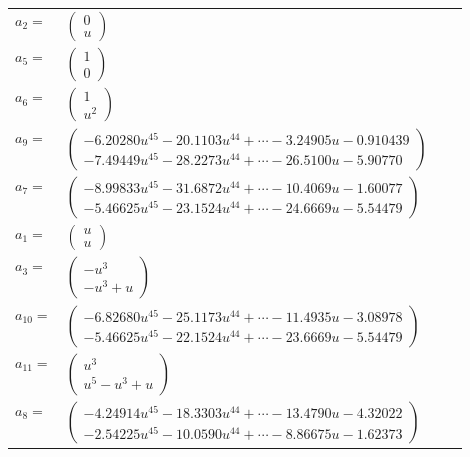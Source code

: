 \documentclass[1p]{elsarticle_modified}
\theoremstyle{definition}
\begin{document}
\begin{tabular}{m{7pt} m{180pt} m{7pt} m{180pt} }
\flushright $a_{2}=$&$\begin{pmatrix}0\\u\end{pmatrix}$ \\
\flushright $a_{5}=$&$\begin{pmatrix}1\\0\end{pmatrix}$ \\
\flushright $a_{6}=$&$\begin{pmatrix}1\\u^2\end{pmatrix}$ \\
\flushright $a_{9}=$&$\begin{pmatrix}-6.20280 u^{45}-20.1103 u^{44}+\cdots-3.24905 u-0.910439\\-7.49449 u^{45}-28.2273 u^{44}+\cdots-26.5100 u-5.90770\end{pmatrix}$ \\
\flushright $a_{7}=$&$\begin{pmatrix}-8.99833 u^{45}-31.6872 u^{44}+\cdots-10.4069 u-1.60077\\-5.46625 u^{45}-23.1524 u^{44}+\cdots-24.6669 u-5.54479\end{pmatrix}$ \\
\flushright $a_{1}=$&$\begin{pmatrix}u\\u\end{pmatrix}$ \\
\flushright $a_{3}=$&$\begin{pmatrix}- u^3\\- u^3+u\end{pmatrix}$ \\
\flushright $a_{10}=$&$\begin{pmatrix}-6.82680 u^{45}-25.1173 u^{44}+\cdots-11.4935 u-3.08978\\-5.46625 u^{45}-22.1524 u^{44}+\cdots-23.6669 u-5.54479\end{pmatrix}$ \\
\flushright $a_{11}=$&$\begin{pmatrix}u^3\\u^5- u^3+u\end{pmatrix}$ \\
\flushright $a_{8}=$&$\begin{pmatrix}-4.24914 u^{45}-18.3303 u^{44}+\cdots-13.4790 u-4.32022\\-2.54225 u^{45}-10.0590 u^{44}+\cdots-8.86675 u-1.62373\end{pmatrix}$ \\

\end{tabular}
\end{document}
